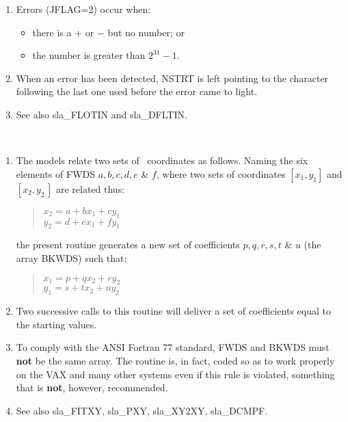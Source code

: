 {\begin{enumerate}
       decode -- following trailing blanks and any comma.  If a
       delimiter other than comma is being used, NSTRT must be
       incremented before the next call to sla\_INTIN, otherwise
       all subsequent calls will return a null result.
 \item Errors (JFLAG=2) occur when:
       \begin{itemize}
       \item there is a + or $-$ but no number; or
       \item the number is greater than $2^{31}-1$.
       \end{itemize}
 \item When an error has been detected, NSTRT is left
       pointing to the character following the last
       one used before the error came to light.
 \item See also sla\_FLOTIN and sla\_DFLTIN.
 \end{enumerate}
}
{
}
{
}
{
  \\
}
\notes
{
 \begin{enumerate}
  \item The models relate two sets of \xy\ coordinates as follows.
        Naming the six elements of FWDS $a,b,c,d,e$ \& $f$,
        where two sets of coordinates $[x_{1},y_{1}]$ and
        $[x_{2},y_{2}\,]$ are related thus:
        \begin{verse}
         $x_{2} = a + bx_{1} + cy_{1}$ \\
         $y_{2} = d + ex_{1} + fy_{1}$
        \end{verse}
        the present routine generates a new set of coefficients
        $p,q,r,s,t$ \& $u$ (the array BKWDS) such that:
        \begin{verse}
         $x_{1} = p + qx_{2} + ry_{2}$ \\
         $y_{1} = s + tx_{2} + uy_{2}$
        \end{verse}
  \item Two successive calls to this routine will deliver a set
        of coefficients equal to the starting values.
  \item To comply with the ANSI Fortran 77 standard, FWDS and BKWDS must
        {\bf not} be the same array.  The routine is, in fact, coded
        so as to work properly on the VAX and many other systems even
        if this rule is violated, something that is {\bf not}, however,
        recommended.
  \item See also sla\_FITXY, sla\_PXY, sla\_XY2XY, sla\_DCMPF.
 \end{enumerate}
}
